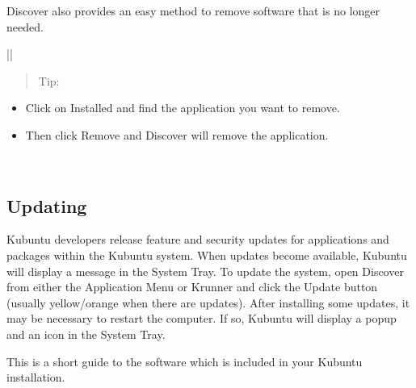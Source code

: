 \documentclass[letterpaper,10pt,english]{sphinxmanual}
\begin{document}
\sphinxAtStartPar
Discover also provides an easy method to remove software that is no longer needed.


\begin{savenotes}\sphinxattablestart
\centering
\begin{tabular}[t]{|*{1}{|}}
\hline
\begin{quote}

\sphinxAtStartPar
Tip:
\end{quote}
\begin{itemize}
\item {} 
\sphinxAtStartPar
Click on Installed and find the application you want to remove.

\item {} 
\sphinxAtStartPar
Then click Remove and Discover will remove the application.

\end{itemize}
\\
\hline
\end{tabular}
\par
\sphinxattableend\end{savenotes}


\subsection{Updating}
\label{\detokenize{docs/software-management/software:updating}}
\sphinxAtStartPar
Kubuntu developers release feature and security updates for applications and packages within the Kubuntu system. When updates become available, Kubuntu will display a message in the System Tray. To update the system, open Discover from either the Application Menu or Krunner and click the Update button (usually yellow/orange when there are updates). After installing some updates, it may be necessary to restart the computer. If so, Kubuntu will display a pop\sphinxhyphen{}up and an icon in the System Tray.

\noindent{}

\sphinxAtStartPar
This is a short guide to the software which is included in your Kubuntu installation.
\end{document}
